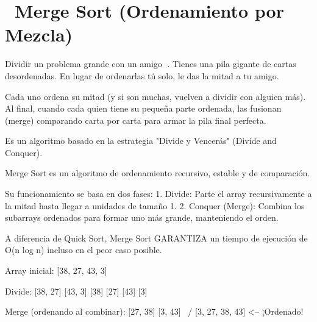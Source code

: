 ﻿\chapter[\emj{🔀}~Merge Sort (Ordenamiento por Mezcla)]{~Merge Sort (Ordenamiento por Mezcla)}

\begin{dsaquees}

Dividir un problema grande con un amigo 🤝. Tienes una pila gigante 
de cartas desordenadas. En lugar de ordenarlas tú solo, le das la 
mitad a tu amigo.

Cada uno ordena su mitad (y si son muchas, vuelven a dividir con 
alguien más). Al final, cuando cada quien tiene su pequeña parte 
ordenada, las fusionan (merge) comparando carta por carta para armar 
la pila final perfecta.

Es un algoritmo basado en la estrategia "Divide y Vencerás" 
(Divide and Conquer).

\end{dsaquees}

\begin{dsaotraforma}

Merge Sort es un algoritmo de ordenamiento recursivo, estable y de
comparación. 

Su funcionamiento se basa en dos fases:
1. Divide: Parte el array recursivamente a la mitad hasta llegar a 
   unidades de tamaño 1.
2. Conquer (Merge): Combina los subarrays ordenados para formar uno
   más grande, manteniendo el orden.

A diferencia de Quick Sort, Merge Sort GARANTIZA un tiempo de 
ejecución de O(n log n) incluso en el peor caso posible.

\end{dsaotraforma}

\begin{dsadiagrama}
Array inicial: [38, 27, 43, 3]

Divide:
[38, 27]       [43, 3]
[38]  [27]     [43]  [3]

Merge (ordenando al combinar):
[27, 38]       [3, 43]
      \         /
      [3, 27, 38, 43]  <-- ¡Ordenado!
\end{dsadiagrama}

